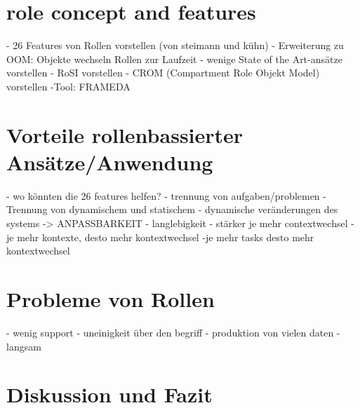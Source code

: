 \documentclass[conference]{IEEEtran}
\begin{document}
\section{role concept and features}
- 26 Features von Rollen vorstellen (von steimann und kühn)
- Erweiterung zu OOM: Objekte wechseln Rollen zur Laufzeit
- wenige State of the Art-ansätze vorstellen
- RoSI vorstellen
	- CROM (Compartment Role Objekt Model) vorstellen
		-Tool: FRAMEDA

\section{Vorteile rollenbassierter Ansätze/Anwendung}
- wo könnten die 26 features helfen? 
- trennung von aufgaben/problemen
- Trennung von dynamischem und statischem
- dynamische veränderungen des systems -> ANPASSBARKEIT
- langlebigkeit
- stärker je mehr contextwechsel
	-je mehr kontexte, desto mehr kontextwechsel
		-je mehr tasks desto mehr kontextwechsel
\section{Probleme von Rollen}
- wenig support
- uneinigkeit über den begriff 
- produktion von vielen daten
- langsam \cite{bachman}


\section{Diskussion und Fazit}

{}

\end{document}
